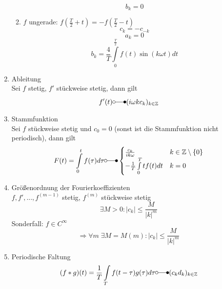\documentclass[a4paper,twocolumn,10pt]{article}
\begin{document}
\begin{enumerate}[label=$\bullet$]
\begin{enumerate}[label=-]
\begin{equation*}
b_k=0
\end{equation*}
\item $f$ ungerade: $f\left(\frac{T}{2}+t\right)=-f\left(\frac{T}{2}-t\right)$
\begin{equation*}
c_k=-c_{-k}
\end{equation*}
\begin{equation*}
a_k=0
\end{equation*}
\begin{equation*}
b_k=\frac{4}{T}\int\limits_{0}^{\frac{T}{2}}f(t)\sin(k\omega t)dt
\end{equation*}
\end{enumerate}
\item Ableitung\\
Sei $f$ stetig, $f'$ stückweise stetig, dann gilt
\begin{equation*}
f'(t)\laplace (i\omega kc_k)_{k\in\mathbb{Z}}
\end{equation*}
\item Stammfunktion\\
Sei $f$ stückweise stetig und $c_0=0$ (sonst ist die Stammfunktion nicht periodisch), dann gilt
\begin{equation*}
F(t)=\int\limits_{0}^{t}f(\tau)d\tau \laplace\begin{cases}\frac{c_k}{ik\omega} & k\in\mathbb{Z}\setminus\{0\} \\ -\frac{1}{T}\int\limits_{0}^{T}tf(t)dt & k=0\end{cases}
\end{equation*}
\item Größenordnung der Fourierkoeffizienten\\
$f,f',...,f^{(m-1)}$ stetig, $f^{(m)}$ stückweise stetig
\begin{equation*}
\exists M>0:|c_k|\leq\frac{M}{|k|^m}
\end{equation*}
Sonderfall: $f\in C^{\infty}$
\begin{equation*}
\Rightarrow \forall m\;\exists M=M(m):|c_k|\leq\frac{M}{|k|^m}
\end{equation*}
\item Periodische Faltung
\begin{equation*}
(f*g)(t)=\frac{1}{T}\int\limits_{T}f(t-\tau)g(\tau)d\tau\laplace (c_kd_k)_{k\in\mathbb{Z}}
\end{equation*}
\end{enumerate}
\end{document}
